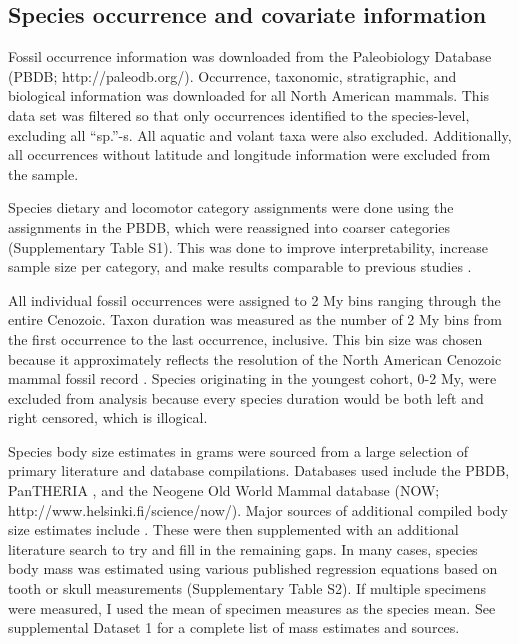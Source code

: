 \documentclass{pnastwo}
\begin{document}
\begin{article}
\begin{materials}
\section{Species occurrence and covariate information}
Fossil occurrence information was downloaded from the Paleobiology Database (PBDB; http://paleodb.org/). Occurrence, taxonomic, stratigraphic, and biological information was downloaded for all North American mammals. This data set was filtered so that only occurrences identified to the species-level, excluding all ``sp.''-s. All aquatic and volant taxa were also excluded. Additionally, all occurrences without latitude and longitude information were excluded from the sample.

Species dietary and locomotor category assignments were done using the assignments in the PBDB, which were reassigned into coarser categories (Supplementary Table S1). This was done to improve interpretability, increase sample size per category, and make results comparable to previous studies \cite{Jernvall2004,Price2012}.

All individual fossil occurrences were assigned to 2 My bins ranging through the entire Cenozoic. Taxon duration was measured as the number of 2 My bins from the first occurrence to the last occurrence, inclusive. This bin size was chosen because it approximately reflects the resolution of the North American Cenozoic mammal fossil record \cite{Alroy2009,Alroy2000g,Marcot2014}. Species originating in the youngest cohort, 0-2 My, were excluded from analysis because every species duration would be both left and right censored, which is illogical.

Species body size estimates in grams were sourced from a large selection of primary literature and database compilations. Databases used include the PBDB, PanTHERIA \cite{Jones2009c}, and the Neogene Old World Mammal database (NOW; http://www.helsinki.fi/science/now/). Major sources of additional compiled body size estimates include \cite{Tomiya2013,Brook2004a,Freudenthal2013,McKenna2011,Raia2012f,Smith2004c}. These were then supplemented with an additional literature search to try and fill in the remaining gaps. In many cases, species body mass was estimated using various published regression equations based on tooth or skull measurements (Supplementary Table S2). If multiple specimens were measured, I used the mean of specimen measures as the species mean. See supplemental Dataset 1 for a complete list of mass estimates and sources.


\end{materials}
\end{article}
\end{document}
